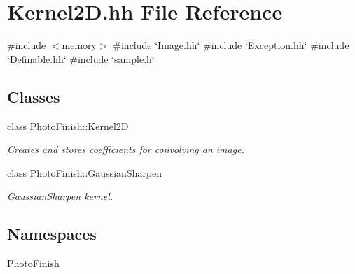 \hypertarget{_kernel2_d_8hh}{}\section{Kernel2\+D.\+hh File Reference}
\label{_kernel2_d_8hh}
{\ttfamily \#include $<$memory$>$}\newline
{\ttfamily \#include \char`\"{}Image.\+hh\char`\"{}}\newline
{\ttfamily \#include \char`\"{}Exception.\+hh\char`\"{}}\newline
{\ttfamily \#include \char`\"{}Definable.\+hh\char`\"{}}\newline
{\ttfamily \#include \char`\"{}sample.\+h\char`\"{}}\newline
\subsection*{Classes}
\begin{DoxyCompactItemize}
\item 
class \hyperlink{class_photo_finish_1_1_kernel2_d}{Photo\+Finish\+::\+Kernel2D}
\begin{DoxyCompactList}\small\item\em Creates and stores coefficients for convolving an image. \end{DoxyCompactList}\item 
class \hyperlink{class_photo_finish_1_1_gaussian_sharpen}{Photo\+Finish\+::\+Gaussian\+Sharpen}
\begin{DoxyCompactList}\small\item\em \hyperlink{class_photo_finish_1_1_gaussian_sharpen}{Gaussian\+Sharpen} kernel. \end{DoxyCompactList}\end{DoxyCompactItemize}
\subsection*{Namespaces}
\begin{DoxyCompactItemize}
\item 
 \hyperlink{namespace_photo_finish}{Photo\+Finish}
\end{DoxyCompactItemize}
